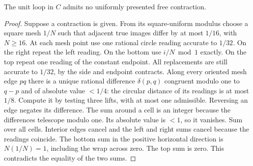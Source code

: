 \begin{lemma}\label{lem:winding}\label{idx-surfaces10}
The unit loop in $C$ admits no uniformly presented free contraction.
\end{lemma}
\begin{proof}
Suppose a contraction is given. From its square-uniform modulus choose a square mesh $1/N$ such that adjacent true images differ by at most $1/16$, with $N\ge 16$. At each mesh point use one rational circle reading accurate to $1/32$. On the right repeat the left reading. On the bottom use $i/N\bmod 1$ exactly. On the top repeat one reading of the constant endpoint. All replacements are still accurate to $1/32$, by the side and endpoint contracts. Along every oriented mesh edge $pq$ there is a unique rational difference $\delta(p,q)$ congruent modulo one to $q-p$ and of absolute value $<1/4$: the circular distance of its readings is at most $1/8$. Compute it by testing three lifts, with at most one admissible. Reversing an edge negates its difference. The sum around a cell is an integer because the differences telescope modulo one. Its absolute value is $<1$, so it vanishes. Sum over all cells. Interior edges cancel and the left and right sums cancel because the readings coincide. The bottom sum in the positive horizontal direction is $N(1/N)=1$, including the wrap across zero. The top sum is zero. This contradicts the equality of the two sums.
\end{proof}

